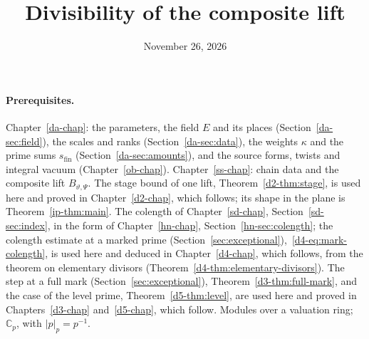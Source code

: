 \documentclass[reqno]{amsart}
\title{Divisibility of the composite lift}
\author{}
\date{November 26, 2026}
\newcounter{chap}
\theoremstyle{definition}
\theoremstyle{plain}
\theoremstyle{definition}
\theoremstyle{remark}
\newcommand{\C}{{\mathbb{C}}}
\newcommand{\sfin}{s_{\mathrm{fin}}}
\begin{document}
\maketitle
{}\label{chap}

\paragraph{Prerequisites.}
Chapter~\ref{da-chap}: the parameters, the field \(E\) and its places (Section~\ref{da-sec:field}), the scales and ranks (Section~\ref{da-sec:data}), the weights \(\kappa\) and the prime sums \(\sfin\) (Section~\ref{da-sec:amounts}), and the source forms, twists and integral vacuum (Chapter~\ref{ob-chap}).  Chapter~\ref{ss-chap}: chain data and the composite lift \(B_{\vartheta,\Psi}\).  The stage bound of one lift, Theorem~\ref{d2-thm:stage}, is used here and proved in Chapter~\ref{d2-chap}, which follows; its shape in the plane is Theorem~\ref{ip-thm:main}.  The colength of Chapter~\ref{sd-chap}, Section~\ref{sd-sec:index}, in the form of Chapter~\ref{hn-chap}, Section~\ref{hn-sec:colength}; the colength estimate at a marked prime (Section~\ref{sec:exceptional}),~\eqref{d4-eq:mark-colength}, is used here and deduced in Chapter~\ref{d4-chap}, which follows, from the theorem on elementary divisors (Theorem~\ref{d4-thm:elementary-divisors}).  The step at a full mark (Section~\ref{sec:exceptional}), Theorem~\ref{d3-thm:full-mark}, and the case of the level prime, Theorem~\ref{d5-thm:level}, are used here and proved in Chapters~\ref{d3-chap} and~\ref{d5-chap}, which follow.  Modules over a valuation ring; \(\C_p\), with \(\lvert p\rvert_p = p^{-1}\).
\end{document}
